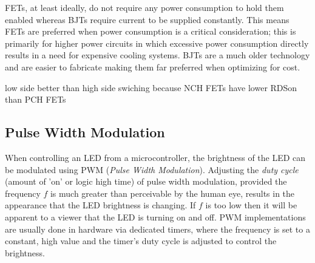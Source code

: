 \documentclass[main.tex]{subfiles}
\begin{document}
FETs, at least ideally, do not require any power consumption to hold them enabled whereas BJTs require current to be supplied constantly. This means FETs are preferred when power consumption is a critical consideration; this is primarily for higher power circuits in which excessive power consumption directly results in a need for expensive cooling systems. BJTs are a much older technology and are easier to fabricate making them far preferred when optimizing for cost.

low side better than high side swiching because NCH FETs have lower RDSon than PCH FETs 

\subsection{Pulse Width Modulation}
When controlling an LED from a microcontroller, the brightness of the LED can be modulated using PWM (\textit{Pulse Width Modulation}). Adjusting the \textit{duty cycle} (amount of 'on' or logic high time) of pulse width modulation, provided the frequency $f$ is much greater than perceivable by the human eye, results in the appearance that the LED brightness is changing. If $f$ is too low then it will be apparent to a viewer that the LED is turning on and off. PWM implementations are usually done in hardware via dedicated timers, where the frequency is set to a constant, high value and the timer's duty cycle is adjusted to control the brightness.  
\end{document}
